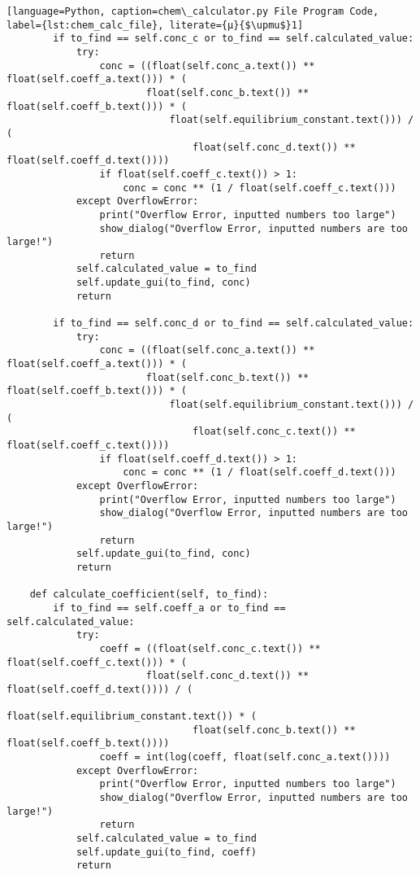 \begin{lstlisting}[language=Python, caption=chem\_calculator.py File Program Code, label={lst:chem_calc_file}, literate={μ}{$\upmu$}1]
        if to_find == self.conc_c or to_find == self.calculated_value:
            try:
                conc = ((float(self.conc_a.text()) ** float(self.coeff_a.text())) * (
                        float(self.conc_b.text()) ** float(self.coeff_b.text())) * (
                            float(self.equilibrium_constant.text())) / (
                                float(self.conc_d.text()) ** float(self.coeff_d.text())))
                if float(self.coeff_c.text()) > 1:
                    conc = conc ** (1 / float(self.coeff_c.text()))
            except OverflowError:
                print("Overflow Error, inputted numbers too large")
                show_dialog("Overflow Error, inputted numbers are too large!")
                return
            self.calculated_value = to_find
            self.update_gui(to_find, conc)
            return

        if to_find == self.conc_d or to_find == self.calculated_value:
            try:
                conc = ((float(self.conc_a.text()) ** float(self.coeff_a.text())) * (
                        float(self.conc_b.text()) ** float(self.coeff_b.text())) * (
                            float(self.equilibrium_constant.text())) / (
                                float(self.conc_c.text()) ** float(self.coeff_c.text())))
                if float(self.coeff_d.text()) > 1:
                    conc = conc ** (1 / float(self.coeff_d.text()))
            except OverflowError:
                print("Overflow Error, inputted numbers too large")
                show_dialog("Overflow Error, inputted numbers are too large!")
                return
            self.update_gui(to_find, conc)
            return

    def calculate_coefficient(self, to_find):
        if to_find == self.coeff_a or to_find == self.calculated_value:
            try:
                coeff = ((float(self.conc_c.text()) ** float(self.coeff_c.text())) * (
                        float(self.conc_d.text()) ** float(self.coeff_d.text()))) / (
                                float(self.equilibrium_constant.text()) * (
                                float(self.conc_b.text()) ** float(self.coeff_b.text())))
                coeff = int(log(coeff, float(self.conc_a.text())))
            except OverflowError:
                print("Overflow Error, inputted numbers too large")
                show_dialog("Overflow Error, inputted numbers are too large!")
                return
            self.calculated_value = to_find
            self.update_gui(to_find, coeff)
            return


\end{lstlisting}
